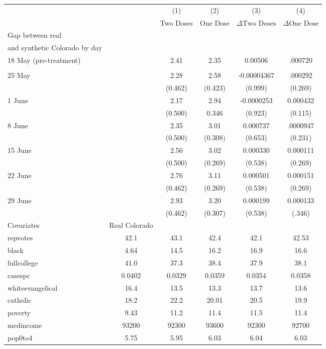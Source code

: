 \begin{minipage}{7in}
	\centering
	\def\sym#1{\ifmmode^{#1}\else\(^{#1}\)\fi}
	\def\arraystretch{1}
	\small
	\begin{tabular*}{\textwidth}{@{\extracolsep{\fill}}l*{5}{c}}
		\hline\hline
		&&\multicolumn{1}{c}{(1)}&\multicolumn{1}{c}{(2)}&\multicolumn{1}{c}{(3)}&\multicolumn{1}{c}{(4)}\\
		&&\multicolumn{1}{c}{Two Doses}&\multicolumn{1}{c}{One Dose}&\multicolumn{1}{c}{$\Delta \textrm{Two Doses}$}&\multicolumn{1}{c}{$\Delta \textrm{One Dose}$}\\
		\hline
		Gap between real\\
		and synthetic Colorado by day\\
		\hline
		18 May (pre-treatment)&&2.41&2.35&0.00506&.000720\\
		\\
		25 May&&2.28&2.58&-0.00004367&.000292\\
		&&(0.462)&(0.423)&(0.999)&(0.269)\\
		1 June&&2.17&2.94&-0.0000253&0.000432\\
		&&(0.500)&0.346&(0.923)&(0.115)\\
		8 June&&2.35&3.01&0.000737&.0000947\\
		&&(0.500)&(0.308)&(0.653)&(0.231)\\
		15 June&&2.56&3.02&0.000330&0.000111\\
		&&(0.500)&(0.269)&(0.538)&(0.269)\\
		22 June&&2.76&3.11&0.000501&0.000151\\
		&&(0.462)&(0.269)&(0.538)&(0.269)\\
		29 June&&2.93&3.20&0.000199&0.000133\\
		&&(0.462)&(0.307)&(0.538)&(.346)\\
		\hline
		Covariates&Real Colorado\\
		\hline
		repvotes&42.1&43.1&42.4&42.1&42.53\\
		black&4.64&14.5&16.2&16.9&16.6\\
		fullcollege&41.0&37.3&38.4&37.9&38.1\\
		casespc&0.0402&0.0329&0.0359&0.0354&0.0358\\
		whiteevangelical&16.4&13.5&13.3&13.7&13.6\\
		catholic&18.2&22.2&20.01&20.5&19.9\\
		poverty&9.43&11.2&11.4&11.5&11.4\\
		medincome&93200&92300&93600&92300&92700\\
		pop0to4&5.75&5.95&6.03&6.04&6.03\\

\end{tabular*}
\end{minipage}
